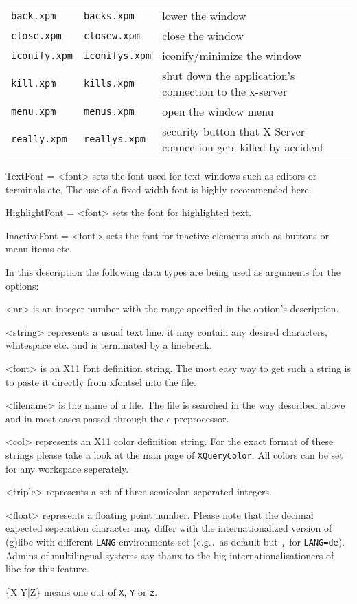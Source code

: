 \documentclass[10pt,a4paper]{article}
\newenvironment{ttdesc}[1]{
   \begin{list}{}{
          \renewcommand{\makelabel}[1]{\texttt{##1\hfill}}}}{\end{list}}
\begin{document}
\begin{ttdesc}{description}
\begin{tabular}{ll p{5cm}l}
\texttt{back.xpm} & \texttt{backs.xpm} & lower the window \\
\texttt{close.xpm} & \texttt{closew.xpm} & close the window \\
\texttt{iconify.xpm} & \texttt{iconifys.xpm}& iconify/minimize the window\\
\texttt{kill.xpm} & \texttt{kills.xpm} & shut down the application's connection to the x-server \\
\texttt{menu.xpm} & \texttt{menus.xpm} & open the window menu\\
\texttt{really.xpm} & \texttt{reallys.xpm} & security button that X-Server connection gets killed by accident \\
\end{tabular}

\item[TextFont = <font>] sets the font used for text windows such as editors or terminals etc. The use of a fixed width font is highly recommended here.
\item[HighlightFont = <font>] sets the font for highlighted text.
\item[InactiveFont = <font>] sets the font for inactive elements such as buttons or menu items etc.

\end{ttdesc}

In this description the following data types are being used as arguments for the options:
\begin{ttdesc}{description}
\item[<nr>] is an integer number with the range specified in the option's description.
\item[<string>] represents a usual text line. it may contain any desired characters, whitespace etc. and is terminated by a linebreak.
\item[<font>] is an X11 font definition string. The most easy way to get such a string is to paste it directly from xfontsel into the file.
\item[<filename>] is the name of a file. The file is searched in the way described above and in most cases passed through the c preprocessor.
\item[<col>] represents an X11 color definition string. For the exact format of these strings please take a look at the man page of \texttt{XQueryColor}. All colors can be set for any workspace seperately.
\item[<triple>] represents a set of three semicolon seperated integers.
\item[<float>] represents a floating point number. Please note that the decimal expected seperation character may differ with the internationalized version of (g)libc with different \texttt{LANG}-environments set (e.g.\texttt{.} as default but \texttt{,} for \texttt{LANG=de}). Admins of multilingual systems say thanx to the big internationalisationers of libc for this feature.
\item[\{X|Y|Z\}] means one out of \texttt{X}, \texttt{Y} or \texttt{z}.
\end{ttdesc}
\end{document}
